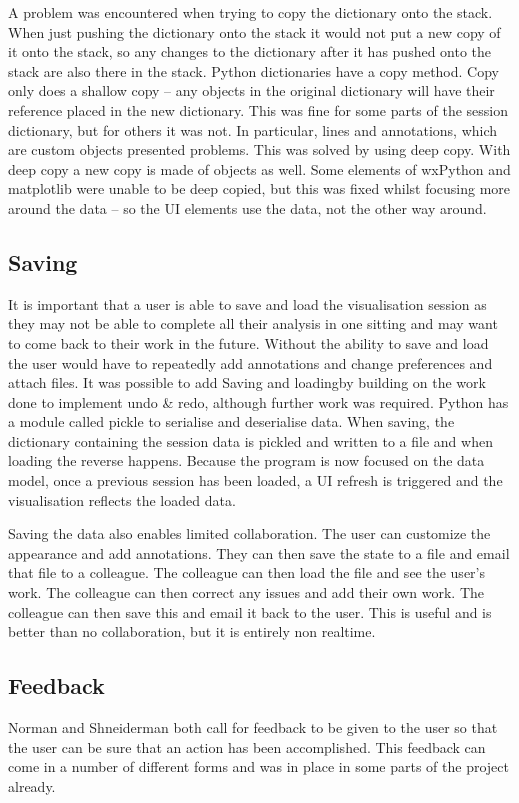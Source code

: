 A problem was encountered when trying to copy the dictionary onto the stack.  When just pushing the dictionary onto the stack it would not put a new copy of it onto the stack, so any changes to the dictionary after it has pushed onto the stack are also there in the stack.  Python dictionaries have a copy method.  Copy only does a shallow copy -- any objects in the original dictionary will have their reference placed in the new dictionary.  This was fine for some parts of the session dictionary, but for others it was not. In particular, lines and annotations, which are custom objects presented problems.  This was solved by using deep copy.  With deep copy a new copy is made of objects as well.  Some elements of wxPython and matplotlib were unable to be deep copied, but this was fixed whilst focusing more around the data -- so the \ac{UI} elements use the data, not the other way around.

\subsection{Saving}

It is important that a user is able to save and load the visualisation session as they may not be able to complete all their analysis in one sitting and may want to come back to their work in the future.  Without the ability to save and load the user would have to repeatedly add annotations and change preferences and attach files.  It was possible to add Saving and loadingby building on the work done to implement undo \& redo, although further work was required. Python has a module called pickle to serialise and deserialise data.  When saving, the dictionary containing the session data is pickled and written to a file and when loading the reverse happens.  Because the program is now focused on the data model, once a previous session has been loaded, a \ac{UI} refresh is triggered and the visualisation reflects the loaded data.

Saving the data also enables limited collaboration.  The user can customize the appearance and add annotations.  They can then save the state to a file and email that file to a colleague.  The colleague can then load the file and see the user's work.  The colleague can then correct any issues and add their own work.  The colleague can then save this and email it back to the user.  This is useful and is better than no collaboration, but it is entirely non realtime.

\subsection{Feedback}
Norman and Shneiderman both call for feedback to be given to the user so that the user can be sure that an action has been accomplished.  This feedback can come in a number of different forms and was in place in some parts of the project already.


